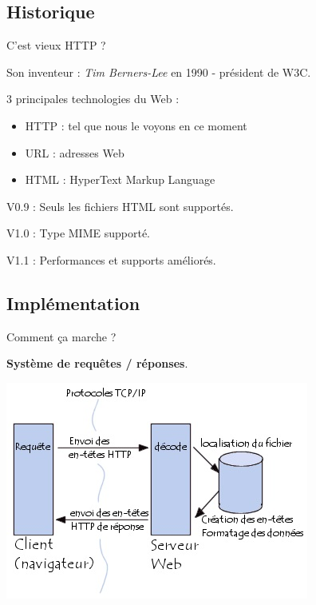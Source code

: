 \subsection{Historique}


\begin{frame}{C'est vieux HTTP ?}
	
Son inventeur : \emph{Tim Berners-Lee} en 1990 - président de W3C. \vspace{1em}

3 principales technologies du Web :
\begin{itemize}
\item HTTP : tel que nous le voyons en ce moment
\item URL : adresses Web
\item HTML : HyperText Markup Language
\end{itemize}
\vspace{1em}

V0.9 : Seuls les fichiers HTML sont supportés.

V1.0 : Type MIME supporté.

V1.1 : Performances et supports améliorés.

\end{frame}



\subsection{Implémentation}


\begin{frame}{Comment ça marche ?}

\begin{flushright}
\textbf{\large Système de requêtes / réponses}. \vspace{1em}
\end{flushright}

\includegraphics[scale=0.75]{img_http/schema_http.jpg}

\end{frame}


